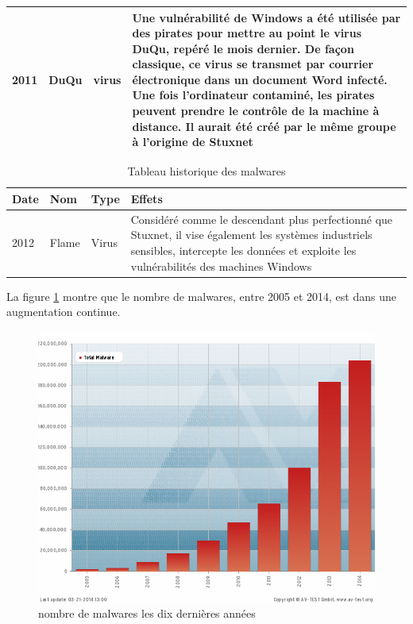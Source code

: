 \begin{table}[H]
\begin{tabular}{|p{1.5cm}|p{2cm}|p{2cm}|p{9cm}|}
\hline 2011 & DuQu & virus & Une vulnérabilité de Windows a été utilisée par des pirates pour mettre au point le virus DuQu, repéré le mois dernier. De façon classique, ce virus se transmet par courrier électronique dans un document Word infecté. Une fois l'ordinateur contaminé, les pirates peuvent prendre le contrôle de la machine à distance. Il aurait été créé par le même groupe à l'origine de Stuxnet\\
\hline
\end{tabular}
\label{malware}
\end{table}
\begin{table}[H]
\begin{tabular}{|p{1.5cm}|p{2cm}|p{2cm}|p{9cm}|}
\hline \textbf{Date} &  \textbf{Nom} & \textbf{Type} & \textbf{Effets} \\
\hline 2012 & Flame & Virus & Considéré comme le descendant plus perfectionné que Stuxnet, il vise également les systèmes industriels sensibles, intercepte les données et exploite les vulnérabilités des machines Windows\\

\hline
\end{tabular}
\caption{Tableau historique des malwares}
\label{malware}
\end{table}

La figure \ref{fig :mal} montre que le nombre de malwares, entre 2005 et 2014, est dans une augmentation continue. \begin{figure}[H]
\begin{center}
\includegraphics[scale=0.4]{Figures/mal.PNG}
\caption{nombre de malwares les dix dernières années}
\label{fig :mal} 
\end{center}
\end{figure}
